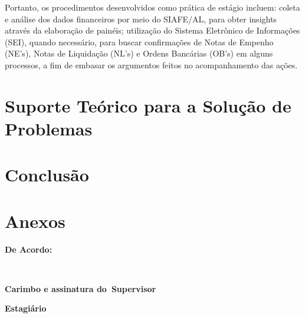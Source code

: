 \documentclass[12pt,a4paper]{article}
\begin{document}
	Portanto, os procedimentos desenvolvidos como prática de estágio incluem: coleta e análise dos dados financeiros por meio do SIAFE/AL, para obter insights através da elaboração de painéis; utilização do Sistema Eletrônico de Informações (SEI), quando necessário, para buscar confirmações de Notas de Empenho (NE’s), Notas de Liquidação (NL’s) e Ordens Bancárias (OB’s) em alguns processos, a fim de embasar os argumentos feitos no acompanhamento das ações.  

	
	\section{Suporte Teórico para a Solução de Problemas}
	\hspace*{1,5cm}
	
	\section{Conclusão}
	\hspace*{1,5cm} 
	
	\section{Anexos}
	
	\newpage
	\vspace{2cm}
	\noindent \textbf{De Acordo:}
	
	\vfill

	\noindent
	\underline{\hspace{7cm}} \hfill \underline{\hspace{7cm}} \\[0.3cm]

	\begin{minipage}[t]{7cm}
		\centering
		\textbf{Carimbo e assinatura do\
		Supervisor}
	\end{minipage}
		\hfill
	\begin{minipage}[t]{7cm}
		\centering
		\textbf{Estagiário}
	\end{minipage}

	
\end{document}
